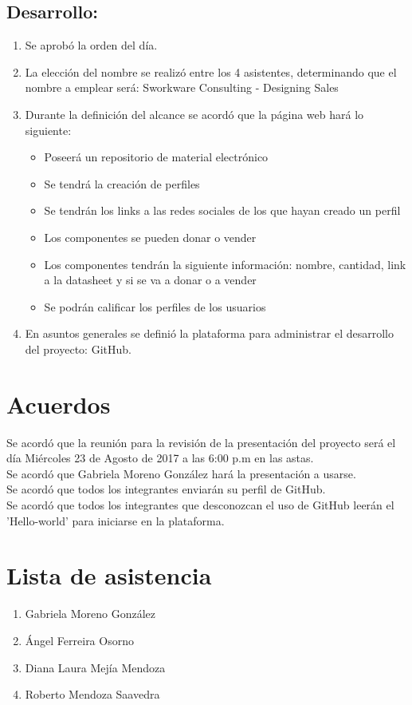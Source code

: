 \documentclass[12pt]{article}
\begin{document}
\subsection{Desarrollo:}
\begin{enumerate}
 	\item Se aprobó la orden del día.
	\item La elección del nombre se realizó entre los 4 asistentes, determinando que el nombre a emplear será: Sworkware Consulting - Designing Sales
	\item Durante la definición del alcance se acordó que la página web hará lo siguiente:
	\begin{itemize}
		\item  Poseerá un repositorio de material electrónico
		\item Se tendrá la creación de perfiles
 		\item  Se tendrán los links a las redes sociales de los que hayan creado un perfil
		\item Los componentes se pueden donar o vender
 		\item  Los componentes tendrán la siguiente información: nombre, cantidad, link a la datasheet y si se va a donar o a vender
 		\item  Se podrán calificar los perfiles de los usuarios
	\end{itemize}
 	\item En asuntos generales se definió la plataforma para administrar el desarrollo del proyecto: GitHub.
\end{enumerate}
\section{Acuerdos}
	Se acordó que la reunión para la revisión de la presentación del proyecto será el día Miércoles 23 de Agosto de 2017 a las 6:00 p.m en las astas. \\
	
	Se acordó que Gabriela Moreno González hará la presentación a usarse. \\
	
	Se acordó que todos los integrantes enviarán su perfil de GitHub. \\
	
	Se acordó que todos los integrantes que desconozcan el uso de GitHub leerán el 'Hello-world' para iniciarse en la plataforma. 
\section{Lista de asistencia}
\begin{enumerate}
 	 \item  Gabriela Moreno González
	 \item  Ángel Ferreira Osorno
	 \item  Diana Laura Mejía Mendoza
	 \item  Roberto Mendoza Saavedra
\end{enumerate}
\end{document}
